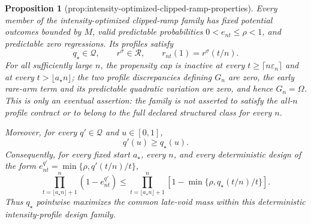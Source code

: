 \documentclass{article}
\newtheorem{proposition}{Proposition}
\begin{document}
\begin{proposition}[prop:intensity-optimized-clipped-ramp-properties]\label{prop:intensity-optimized-clipped-ramp-properties}
Every member of the intensity-optimized clipped-ramp family has fixed potential outcomes bounded by \(M\), valid predictable probabilities \(0<e_{nt}\le\rho<1\), and predictable zero regressions. Its profiles satisfy
\[
 q_\star\in\mathcal Q,\qquad r^\sigma\in\mathcal R,
 \qquad r_{nt}(1)=r^\sigma(t/n).
\]
For all sufficiently large \(n\), the propensity cap is inactive at every \(t\ge\lceil n\varepsilon_n\rceil\) and at every \(t>\lfloor a_\star n\rfloor\); the two profile discrepancies defining \(G_n\) are zero, the early rare-arm term and its predictable quadratic variation are zero, and hence \(G_n=\Omega\). This is only an eventual assertion: the family is not asserted to satisfy the all-\(n\) profile contract or to belong to the full declared structured class for every \(n\).

Moreover, for every \(q'\in\mathcal Q\) and \(u\in[0,1]\),
\[
 q'(u)\ge q_\star(u).
\]
Consequently, for every fixed start \(a_\star\), every \(n\), and every deterministic design of the form \(e_{nt}^{q'}=\min\{\rho,q'(t/n)/t\}\),
\[
 \prod_{t=\lfloor a_\star n\rfloor+1}^{n}(1-e_{nt}^{q'})
 \le
 \prod_{t=\lfloor a_\star n\rfloor+1}^{n}
 \left[1-\min\{\rho,q_\star(t/n)/t\}\right].
\]
Thus \(q_\star\) pointwise maximizes the common late-void mass within this deterministic intensity-profile design family.
\end{proposition}
\end{document}
